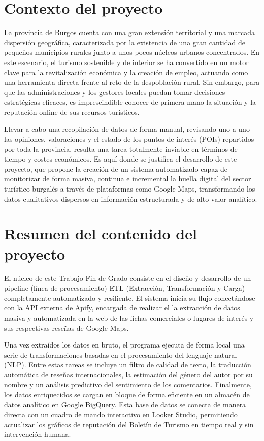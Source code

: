 
\section{Contexto del proyecto}
La provincia de Burgos cuenta con una gran extensión territorial y una marcada dispersión geográfica, caracterizada por la existencia de una gran cantidad de pequeños municipios rurales junto a unos pocos núcleos urbanos concentrados. En este escenario, el turismo sostenible y de interior se ha convertido en un motor clave para la revitalización económica y la creación de empleo, actuando como una herramienta directa frente al reto de la despoblación rural. Sin embargo, para que las administraciones y los gestores locales puedan tomar decisiones estratégicas eficaces, es imprescindible conocer de primera mano la situación y la reputación online de sus recursos turísticos.

Llevar a cabo una recopilación de datos de forma manual, revisando uno a uno las opiniones, valoraciones y el estado de los puntos de interés (POIs) repartidos por toda la provincia, resulta una tarea totalmente inviable en términos de tiempo y costes económicos. Es aquí donde se justifica el desarrollo de este proyecto, que propone la creación de un sistema automatizado capaz de monitorizar de forma masiva, continua e incremental la huella digital del sector turístico burgalés a través de plataformas como Google Maps, transformando los datos cualitativos dispersos en información estructurada y de alto valor analítico.

\section{Resumen del contenido del proyecto}
El núcleo de este Trabajo Fin de Grado consiste en el diseño y desarrollo de un pipeline (línea de procesamiento) ETL (Extracción, Transformación y Carga) completamente automatizado y resiliente. El sistema inicia su flujo conectándose con la API externa de Apify, encargada de realizar el la extracción de datos masiva y automatizada en la web de las fichas comerciales o lugares de interés y sus respectivas reseñas de Google Maps. 

Una vez extraídos los datos en bruto, el programa ejecuta de forma local una serie de transformaciones basadas en el procesamiento del lenguaje natural (NLP). Entre estas tareas se incluye un filtro de calidad de texto, la traducción automática de reseñas internacionales, la estimación del género del autor por su nombre y un análisis predictivo del sentimiento de los comentarios. Finalmente, los datos enriquecidos se cargan en bloque de forma eficiente en un almacén de datos analítico en Google BigQuery. Esta base de datos se conecta de manera directa con un cuadro de mando interactivo en Looker Studio, permitiendo actualizar los gráficos de reputación del Boletín de Turismo en tiempo real y sin intervención humana.

